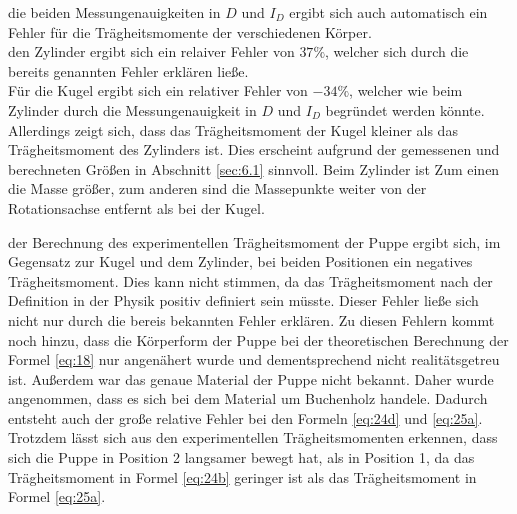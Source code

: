 \justifying \;die beiden Messungenauigkeiten in $D$ und $I_D$ ergibt
sich auch automatisch ein Fehler für die Trägheitsmomente der verschiedenen Körper.\\

\justifying den Zylinder ergibt sich ein relaiver Fehler von $37\%$, welcher  sich
durch die bereits genannten Fehler erklären ließe. \\
Für die Kugel ergibt sich ein relativer Fehler von $-34\%$, welcher wie beim Zylinder durch
die Messungenauigkeit in $D$ und $I_D$ begründet werden könnte.
Allerdings zeigt sich, dass das Trägheitsmoment der Kugel kleiner als das Trägheitsmoment
des Zylinders ist. Dies erscheint aufgrund der gemessenen und berechneten Größen in Abschnitt \ref{sec:6.1}
sinnvoll. Beim Zylinder ist Zum einen die Masse größer, zum  anderen sind die Massepunkte weiter 
von der Rotationsachse entfernt als bei der Kugel.

\justifying der Berechnung des experimentellen Trägheitsmoment der Puppe ergibt
sich, im Gegensatz zur Kugel und dem Zylinder, bei beiden Positionen
 ein negatives Trägheitsmoment. Dies kann nicht stimmen, da das Trägheitsmoment
 nach der Definition in der Physik positiv definiert sein müsste. Dieser Fehler ließe
 sich nicht nur durch die bereis bekannten Fehler erklären. Zu diesen Fehlern kommt
 noch hinzu, dass die Körperform der Puppe bei der theoretischen Berechnung
 der Formel \eqref{eq:18} nur angenähert wurde und dementsprechend nicht
 realitätsgetreu ist. Außerdem war das genaue Material der Puppe nicht bekannt.
 Daher wurde angenommen, dass es sich bei dem Material um Buchenholz handele.
 Dadurch entsteht auch der große relative Fehler bei den Formeln \eqref{eq:24d} und \eqref{eq:25a}.
 Trotzdem lässt sich aus den experimentellen Trägheitsmomenten erkennen, dass
 sich die Puppe in Position 2 langsamer bewegt hat, als in Position 1, da das
 Trägheitsmoment in Formel \eqref{eq:24b} geringer ist als das Trägheitsmoment in
 Formel \eqref{eq:25a}.

\newpage

\printbibliography
